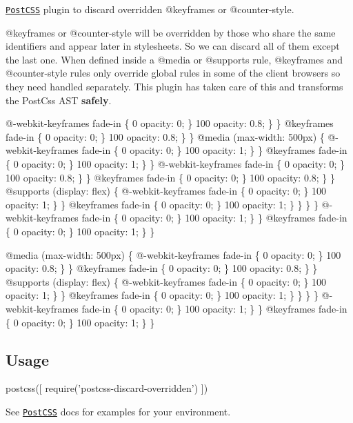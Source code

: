 \href{https://github.com/postcss/postcss}{\tt Post\+C\+SS} plugin to discard overridden {\ttfamily @keyframes} or {\ttfamily @counter-\/style}.

{\ttfamily @keyframes} or {\ttfamily @counter-\/style} will be overridden by those who share the same identifiers and appear later in stylesheets. So we can discard all of them except the last one. When defined inside a {\ttfamily @media} or {\ttfamily @supports} rule, {\ttfamily @keyframes} and {\ttfamily @counter-\/style} rules only override global rules in some of the client browsers so they need handled separately. This plugin has taken care of this and transforms the Post\+Css A\+ST {\bfseries safely}.


\begin{DoxyCode}
@-webkit-keyframes fade-in \{
  0%
    opacity: 0;
  \}
  100%
    opacity: 0.8;
  \}
\}
@keyframes fade-in \{
  0%
    opacity: 0;
  \}
  100%
    opacity: 0.8;
  \}
\}
@media (max-width: 500px) \{
  @-webkit-keyframes fade-in \{
    0%
      opacity: 0;
    \}
    100%
      opacity: 1;
    \}
  \}
  @keyframes fade-in \{
    0%
      opacity: 0;
    \}
    100%
      opacity: 1;
    \}
  \}
  @-webkit-keyframes fade-in \{
    0%
      opacity: 0;
    \}
    100%
      opacity: 0.8;
    \}
  \}
  @keyframes fade-in \{
    0%
      opacity: 0;
    \}
    100%
      opacity: 0.8;
    \}
  \}
  @supports (display: flex) \{
    @-webkit-keyframes fade-in \{
      0%
        opacity: 0;
      \}
      100%
        opacity: 1;
      \}
    \}
    @keyframes fade-in \{
      0%
        opacity: 0;
      \}
      100%
        opacity: 1;
      \}
    \}
  \}
\}
@-webkit-keyframes fade-in \{
  0%
    opacity: 0;
  \}
  100%
    opacity: 1;
  \}
\}
@keyframes fade-in \{
  0%
    opacity: 0;
  \}
  100%
    opacity: 1;
  \}
\}
\end{DoxyCode}



\begin{DoxyCode}
@media (max-width: 500px) \{
  @-webkit-keyframes fade-in \{
    0%
      opacity: 0;
    \}
    100%
      opacity: 0.8;
    \}
  \}
  @keyframes fade-in \{
    0%
      opacity: 0;
    \}
    100%
      opacity: 0.8;
    \}
  \}
  @supports (display: flex) \{
    @-webkit-keyframes fade-in \{
      0%
        opacity: 0;
      \}
      100%
        opacity: 1;
      \}
    \}
    @keyframes fade-in \{
      0%
        opacity: 0;
      \}
      100%
        opacity: 1;
      \}
    \}
  \}
\}
@-webkit-keyframes fade-in \{
  0%
    opacity: 0;
  \}
  100%
    opacity: 1;
  \}
\}
@keyframes fade-in \{
  0%
    opacity: 0;
  \}
  100%
    opacity: 1;
  \}
\}
\end{DoxyCode}


\subsection*{Usage}


\begin{DoxyCode}
postcss([ require('postcss-discard-overridden') ])
\end{DoxyCode}


See \href{https://github.com/postcss/postcss}{\tt Post\+C\+SS} docs for examples for your environment. 